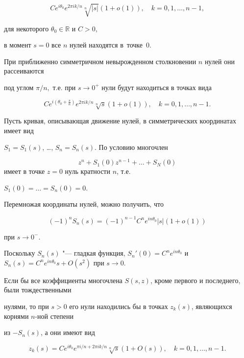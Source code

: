 $$Ce^{i\theta_0}e^{2\pi ik/n}\sqrt[n]{|s|}(1+o(1)),\quad k=0, 1,\dots,n-1,$$

для некоторого $\theta_0\in\mathbb R$ и $C>0$,

в момент $s=0$ все $n$ нулей находятся в~точке~$0$. 



\smallskip



\hypertarget{localscatteringtheorem}{}

\begin{theorem}[1]

При приближенно симметричном невырожденном столкновении $n$ нулей они рассеиваются

под углом $\pi/n,$ т$.$е$.$ при $s\to0^+$ нули будут находиться в точках вида

$$Ce^{i(\theta_0+\frac\pi n)}e^{2\pi ik/n}\sqrt[n]{s}(1+o(1)),\quad k=0, 1,\dots,n-1.$$

\end{theorem}



\smallskip



\proof

Пусть кривая, описывающая движение нулей, в симметрических координатах имеет вид

$S_1=S_1(s)$, \dots, $S_n=S_n(s)$. По условию многочлен 

$$z^n+S_1(0)z^{n-1}+\dots+S_N(0)$$ имеет в точке $z=0$ нуль кратности $n$, т.е.

$S_1(0)=\dots=S_{n}(0)=0$. 





Перемножая координаты нулей, можно получить, что 

$$(-1)^n S_n(s)=(-1)^{n-1}C^ne^{in\theta_0}|s|(1+o(1))$$

при $s\to0^{-}$. 

Поскольку $S_n(s)$ "---  гладкая функция,   $S_n'(0)=C^ne^{in\theta_0}$ и $S_n(s)=C^ne^{in\theta_0}s+O(s^2)$ при $s\to0$.

Если бы все коэффициенты многочлена $S(s,z)$, кроме первого и последнего, были  тождественными 

нулями, то при ${s>0}$ его нули находились бы в точках $z_k(s)$, являющихся корнями $n$-ной степени 

из ${-S_n(s)}$, а они имеют вид

$$z_k(s)=Ce^{i\theta_0}e^{\pi i/n+2\pi ik/n}\sqrt[n]{s}(1+O(s)),\quad k=0, 1,\dots,n-1.$$



